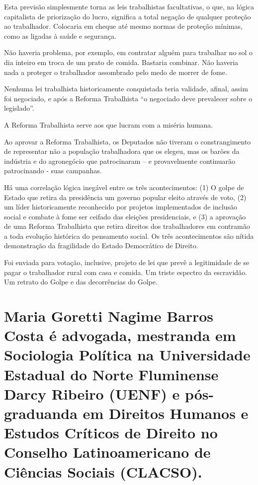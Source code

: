 Esta previsão simplesmente torna as leis trabalhistas facultativas, o
que, na lógica capitalista de priorização do lucro, significa a total
negação de qualquer proteção ao trabalhador. Colocaria em cheque até
mesmo normas de proteção mínimas, como as ligadas à saúde e segurança.

Não haveria problema, por exemplo, em contratar alguém para trabalhar no
sol o dia inteiro em troca de um prato de comida. Bastaria combinar. Não
haveria nada a proteger o trabalhador assombrado pelo medo de morrer de
fome.

Nenhuma lei trabalhista historicamente conquistada teria validade,
afinal, assim foi negociado, e após a Reforma Trabalhista ``o negociado
deve prevalecer sobre o legislado''.

A Reforma Trabalhista serve aos que lucram com a miséria humana.

Ao aprovar a Reforma Trabalhista, os Deputados não tiveram o
constrangimento de representar não a população trabalhadora que os
elegeu, mas os barões da indústria e do agronegócio que patrocinaram --
e provavelmente continuarão patrocinando - suas campanhas.

Há uma correlação lógica inegável entre os três acontecimentos: (1) O
golpe de Estado que retira da presidência um governo popular eleito
através de voto, (2) um líder historicamente reconhecido por projetos
implementados de inclusão social e combate à fome ser ceifado das
eleições presidenciais, e (3) a aprovação de uma Reforma Trabalhista que
retira direitos dos trabalhadores em contramão a toda evolução histórica
do pensamento social. Os três acontecimentos são nítida demonstração da
fragilidade do Estado Democrático de Direito.

Foi enviada para votação, inclusive, projeto de lei que prevê a
legitimidade de se pagar o trabalhador rural com casa e comida. Um
triste espectro da escravidão. Um retrato do Golpe e das decorrências do
Golpe.

\section{Maria Goretti Nagime Barros Costa é advogada, mestranda em
Sociologia Política na Universidade Estadual do Norte Fluminense Darcy
Ribeiro (UENF) e pós-graduanda em Direitos Humanos e Estudos Críticos de
Direito no Conselho Latinoamericano de Ciências Sociais (CLACSO).
}\label{maria-goretti-nagime-barros-costa-uxe9-advogada-mestranda-em-sociologia-poluxedtica-na-universidade-estadual-do-norte-fluminense-darcy-ribeiro-uenf-e-puxf3s-graduanda-em-direitos-humanos-e-estudos-cruxedticos-de-direito-no-conselho-latinoamericano-de-ciuxeancias-sociais-clacso.}
